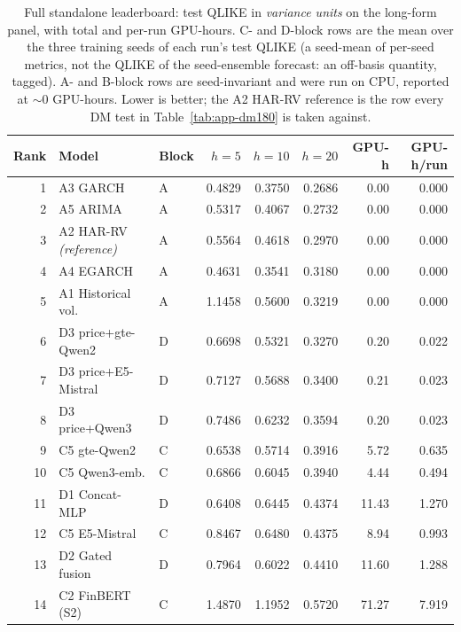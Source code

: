 \begin{table}[htbp]
\centering
\caption[Full standalone leaderboard, long-form panel]{Full standalone
leaderboard: test QLIKE in \emph{variance units} on the long-form panel,
with total and per-run GPU-hours. C- and D-block rows are the mean over
the three training seeds of each run's test QLIKE (a seed-mean of
per-seed metrics, not the QLIKE of the seed-ensemble forecast: an
off-basis quantity, tagged). A- and B-block rows are seed-invariant and
were run on CPU, reported at $\sim$0 GPU-hours. Lower is better; the A2
HAR-RV reference is the row every DM test in
Table~\ref{tab:app-dm180} is taken against.}
\label{tab:app-leaderboard}
\singlespacing\small
\setlength{\tabcolsep}{4pt}
\begin{tabular}{@{}rllrrrrr@{}}
\toprule
Rank & Model & Block & $h{=}5$ & $h{=}10$ & $h{=}20$ & GPU-h & GPU-h/run \\
\midrule
1  & A3 GARCH            & A & 0.4829 & 0.3750 & 0.2686 & 0.00   & 0.000 \\
2  & A5 ARIMA            & A & 0.5317 & 0.4067 & 0.2732 & 0.00   & 0.000 \\
3  & A2 HAR-RV \emph{(reference)} & A & 0.5564 & 0.4618 & 0.2970 & 0.00 & 0.000 \\
4  & A4 EGARCH           & A & 0.4631 & 0.3541 & 0.3180 & 0.00   & 0.000 \\
5  & A1 Historical vol.  & A & 1.1458 & 0.5600 & 0.3219 & 0.00   & 0.000 \\
6  & D3 price+gte-Qwen2  & D & 0.6698 & 0.5321 & 0.3270 & 0.20   & 0.022 \\
7  & D3 price+E5-Mistral & D & 0.7127 & 0.5688 & 0.3400 & 0.21   & 0.023 \\
8  & D3 price+Qwen3      & D & 0.7486 & 0.6232 & 0.3594 & 0.20   & 0.023 \\
9  & C5 gte-Qwen2        & C & 0.6538 & 0.5714 & 0.3916 & 5.72   & 0.635 \\
10 & C5 Qwen3-emb.       & C & 0.6866 & 0.6045 & 0.3940 & 4.44   & 0.494 \\
11 & D1 Concat-MLP       & D & 0.6408 & 0.6445 & 0.4374 & 11.43  & 1.270 \\
12 & C5 E5-Mistral       & C & 0.8467 & 0.6480 & 0.4375 & 8.94   & 0.993 \\
13 & D2 Gated fusion     & D & 0.7964 & 0.6022 & 0.4410 & 11.60  & 1.288 \\
14 & C2 FinBERT (S2)     & C & 1.4870 & 1.1952 & 0.5720 & 71.27  & 7.919 \\

\end{tabular}
\end{table}
